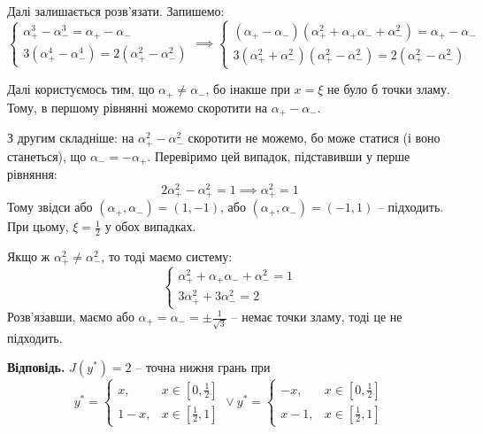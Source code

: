 \documentclass[oneside,solution]{template}
\begin{document}
Далі залишається розв'язати. Запишемо:
\begin{equation*}
    \begin{cases}
        \alpha_+^3 - \alpha_-^3 = \alpha_+-\alpha_- \\
        3(\alpha_+^4 - \alpha_-^4) = 2(\alpha_+^2 - \alpha_-^2)
    \end{cases} \implies \begin{cases}
        (\alpha_+ - \alpha_-)(\alpha_+^2+\alpha_+\alpha_- + \alpha_-^2) = \alpha_+-\alpha_- \\
        3(\alpha_+^2+\alpha_-^2)(\alpha_+^2-\alpha_-^2) = 2(\alpha_+^2 - \alpha_-^2)
    \end{cases}
\end{equation*}

Далі користуємось тим, що $\alpha_+ \neq \alpha_-$, бо інакше при $x=\xi$ не було б точки зламу. Тому, в першому рівнянні можемо скоротити на $\alpha_+-\alpha_-$.

З другим складніше: на $\alpha_+^2-\alpha_-^2$ скоротити не можемо, бо може статися (і воно станеться), що $\alpha_-=-\alpha_+$. Перевіримо цей випадок, підставивши у перше рівняння:
\begin{equation*}
    2\alpha_+^2 - \alpha_+^2 = 1 \implies \alpha_+^2 = 1
\end{equation*}
Тому звідси або $(\alpha_+,\alpha_-)=(1,-1)$, або $(\alpha_+,\alpha_-)=(-1,1)$ -- підходить. При цьому, $\xi=\frac{1}{2}$ у обох випадках.

Якщо ж $\alpha_+^2 \neq \alpha_-^2$, то тоді маємо систему:
\begin{equation*}
    \begin{cases}
        \alpha_+^2 + \alpha_+\alpha_- + \alpha_-^2 = 1 \\
        3\alpha_+^2 + 3\alpha_-^2 = 2
    \end{cases}
\end{equation*}
Розв'язавши, маємо або $\alpha_+=\alpha_-=\pm\frac{1}{\sqrt{3}}$ -- немає точки зламу, тоді це не підходить. 

\textbf{Відповідь.} $J(y^*) = 2$ -- точна нижня грань при 
\begin{equation*}
    y^* = \begin{cases}
        x, & x \in [0,\frac{1}{2}] \\
        1-x, & x \in [\frac{1}{2},1]
    \end{cases} \vee y^* = \begin{cases}
        -x, & x \in [0,\frac{1}{2}] \\
        x-1, & x \in [\frac{1}{2},1]
    \end{cases}
\end{equation*}
\end{document}
